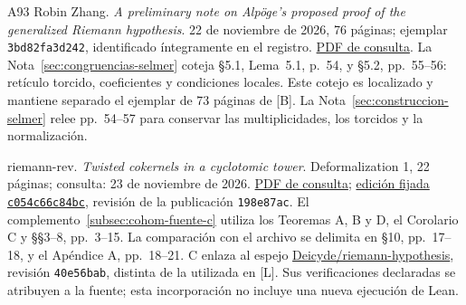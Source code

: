 \begin{thebibliography}{A93}
Robin Zhang.
\emph{A preliminary note on Alpöge's proposed proof of the generalized
Riemann hypothesis}.
22 de noviembre de 2026, 76 páginas; ejemplar
\texttt{3bd82fa3d242}, identificado íntegramente en el registro.
\href{https://www.ihes.fr/~rzhang/files/GRH\%20note.pdf}{PDF de consulta}.
La Nota~\ref{sec:congruencias-selmer} coteja §5.1, Lema~5.1,
p.~54, y §5.2, pp.~55--56: retículo torcido, coeficientes
y condiciones locales. Este cotejo es localizado y mantiene
separado el ejemplar de 73 páginas de [B].
La Nota~\ref{sec:construccion-selmer} relee pp.~54--57
para conservar las multiplicidades, los torcidos y la normalización.

riemann-rev.
\emph{Twisted cokernels in a cyclotomic tower}.
Deformalization 1, 22 páginas; consulta: 23 de noviembre de 2026.
\href{https://nasqret.github.io/riemann-rev/digests/tower-bound.pdf}{PDF de consulta};
\href{https://github.com/nasqret/riemann-rev/blob/198e87ac146b38a2b31e15faa3ba81c4bc4dd497/digests/tower-bound/editions/tower-bound-c054c66c84bc.pdf}{edición fijada \texttt{c054c66c84bc}},
revisión de la publicación \texttt{198e87ac}.
El complemento~\ref{subsec:cohom-fuente-c} utiliza los Teoremas A, B y D,
el Corolario C y §§3--8, pp.~3--15. La comparación con el archivo se delimita
en §10, pp.~17--18, y el Apéndice A, pp.~18--21.
C enlaza al espejo \href{https://github.com/Deicyde/riemann-hypothesis/tree/40e56bab026552e089d7afcfeff08d2defb9c005}{Deicyde/riemann-hypothesis},
revisión \texttt{40e56bab}, distinta de la utilizada en [L].
Sus verificaciones declaradas se atribuyen a la fuente;
esta incorporación no incluye una nueva ejecución de Lean.


\end{thebibliography}
